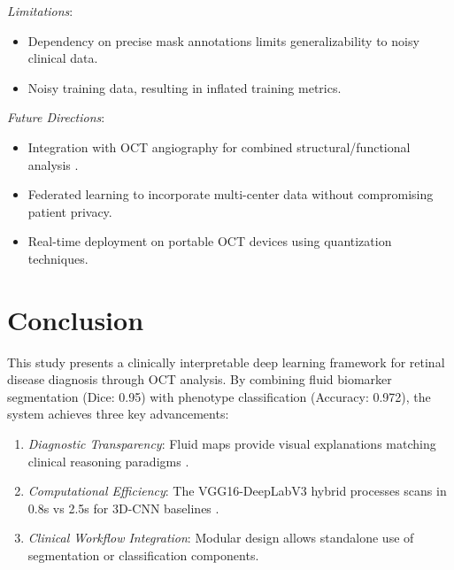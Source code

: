 \documentclass[conference]{IEEEtran}
\begin{document}
\textit{Limitations}:
\begin{itemize}
    \item Dependency on precise mask annotations limits generalizability to noisy clinical data.
    \item Noisy training data, resulting in inflated training metrics.
\end{itemize}

\textit{Future Directions}:
\begin{itemize}
    \item Integration with OCT angiography for combined structural/functional analysis \cite{Hilely2021SubretinalFluid}.
    \item Federated learning to incorporate multi-center data without compromising patient privacy.
    \item Real-time deployment on portable OCT devices using quantization techniques.
\end{itemize}

\section{Conclusion}
This study presents a clinically interpretable deep learning framework for retinal disease diagnosis through OCT analysis. By combining fluid biomarker segmentation (Dice: 0.95) with phenotype classification (Accuracy: 0.972), the system achieves three key advancements:
\begin{enumerate}
    \item \textit{Diagnostic Transparency}: Fluid maps provide visual explanations matching clinical reasoning paradigms \cite{Sikorski2011DrusenFluid}.
    \item \textit{Computational Efficiency}: The VGG16-DeepLabV3 hybrid processes scans in 0.8s vs 2.5s for 3D-CNN baselines \cite{retinalclass}.
    \item \textit{Clinical Workflow Integration}: Modular design allows standalone use of segmentation or classification components.
\end{enumerate}


\end{document}

